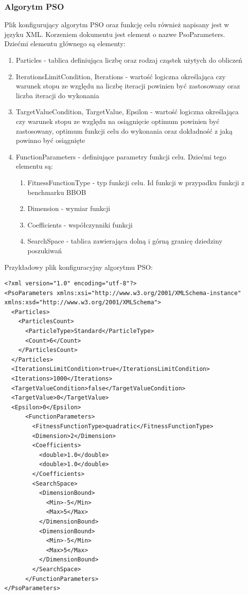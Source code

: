\documentclass[12pt, twoside, openany, abstract=on]{report}
\theoremstyle{definition}
\begin{document}
\subsubsection{Algorytm PSO}
Plik konfigurujący algorytm PSO oraz funkcję celu również napisany jest w języku XML. Korzeniem dokumentu jest element o nazwe PsoParameters. 
Dziećmi elementu głównego są elementy:
\begin{enumerate}
	\item Particles - tablica definiująca liczbę oraz rodzaj cząstek użytych do obliczeń
	\item IterationsLimitCondition, Iterations - wartość logiczna określająca czy warunek stopu ze względu na liczbę iteracji powinien być zastosowany oraz liczba iteracji do wykonania
	\item TargetValueCondition, TargetValue, Epsilon - wartość logiczna określająca czy warunek stopu ze względu na osiągnięcie optimum powinien być zastosowany, optimum funkcji celu do wykonania oraz dokładność z jaką powinno być osiągnięte
	\item FunctionParameters - definiujące parametry funkcji celu. Dziećmi tego elementu są:
	\begin{enumerate}
		\item FitnessFunctionType - typ funkcji celu. Id funkcji w przypadku funkcji z benchmarku BBOB
		\item Dimension - wymiar funkcji
		\item Coefficients - współczynniki funkcji
		\item SearchSpace - tablica zawierająca dolną i górną granicę dziedziny poszukiwań
	\end{enumerate}

\end{enumerate}
\clearpage
Przykładowy plik konfiguracyjny algorytmu PSO:
\lstset{language=XML}
\begin{lstlisting}[frame=single]
<?xml version="1.0" encoding="utf-8"?>
<PsoParameters xmlns:xsi="http://www.w3.org/2001/XMLSchema-instance" xmlns:xsd="http://www.w3.org/2001/XMLSchema">
  <Particles>
    <ParticlesCount>
      <ParticleType>Standard</ParticleType>
      <Count>6</Count>
    </ParticlesCount>
  </Particles>
  <IterationsLimitCondition>true</IterationsLimitCondition>
  <Iterations>1000</Iterations>
  <TargetValueCondition>false</TargetValueCondition>
  <TargetValue>0</TargetValue>
  <Epsilon>0</Epsilon>
      <FunctionParameters>
        <FitnessFunctionType>quadratic</FitnessFunctionType>
        <Dimension>2</Dimension>
        <Coefficients>
          <double>1.0</double>
          <double>1.0</double>
        </Coefficients>
        <SearchSpace>
          <DimensionBound>
            <Min>-5</Min>
            <Max>5</Max>
          </DimensionBound>
    	  <DimensionBound>
            <Min>-5</Min>
            <Max>5</Max>
          </DimensionBound>
        </SearchSpace>
      </FunctionParameters>
</PsoParameters>
\end{lstlisting}
\end{document}

